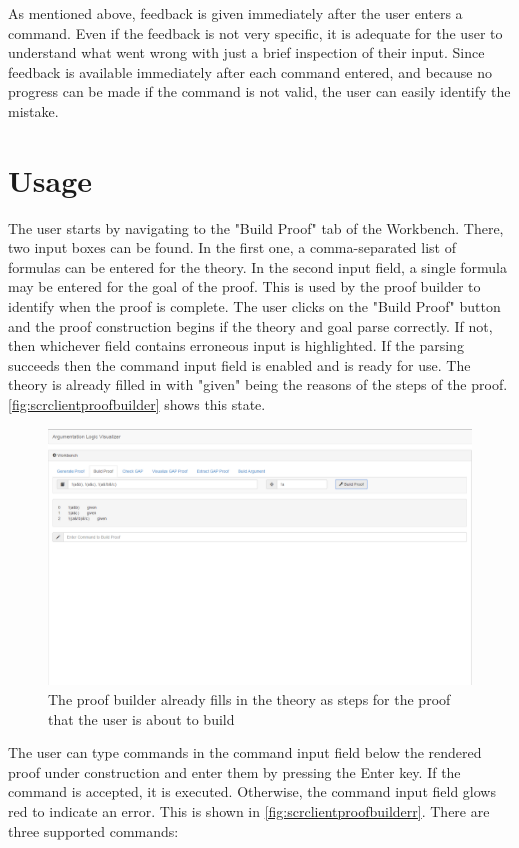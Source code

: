 \documentclass[11pt,twoside,a4paper]{report}
\begin{document}
As mentioned above, feedback is given immediately after the user enters a command. Even if the feedback is not very specific, it is adequate for the user to understand what went wrong with just a brief inspection of their input. Since feedback is available immediately after each command entered, and because no progress can be made if the command is not valid, the user can easily identify the mistake.

\section{Usage}
The user starts by navigating to the "Build Proof" tab of the Workbench. There, two input boxes can be found. In the first one, a comma-separated list of formulas can be entered for the theory. In the second input field, a single formula may be entered for the goal of the proof. This is used by the proof builder to identify when the proof is complete. The user clicks on the "Build Proof" button and the proof construction begins if the theory and goal parse correctly. If not, then whichever field contains erroneous input is highlighted. If the parsing succeeds then the command input field is enabled and is ready for use. The theory is already filled in with "given" being the reasons of the steps of the proof. \autoref{fig:scrclientproofbuilder} shows this state.

\begin{figure}[htp]
\centerline{\includegraphics[scale=0.3]{img/scr-client-proofbuilder.png}}
\caption{The proof builder already fills in the theory as steps for the proof that the user is about to build\label{fig:scrclientproofbuilder}}
\end{figure}

The user can type commands in the command input field below the rendered proof under construction and enter them by pressing the Enter key. If the command is accepted, it is executed. Otherwise, the command input field glows red to indicate an error. This is shown in \autoref{fig:scrclientproofbuilderr}. There are three supported commands:
\end{document}
